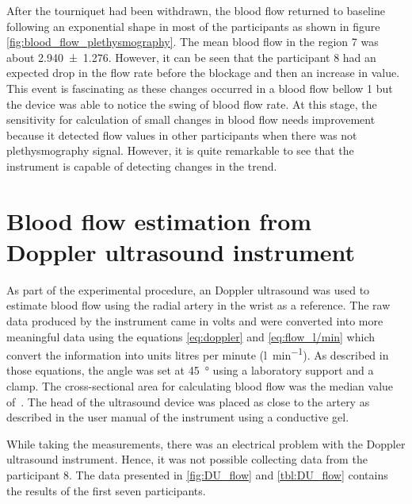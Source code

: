 After the tourniquet had been withdrawn, the blood flow returned to baseline following an exponential shape in most of the participants as shown in figure \ref{fig:blood_flow_plethysmography}. The mean blood flow in the region 7 was about \SI{2.940(1276)}{\bfv}. However, it can be seen that the participant 8 had an expected drop in the flow rate before the blockage and then an increase in value. This event is fascinating as these changes occurred in a blood flow bellow \SI{1}{\bfv} but the device was able to notice the swing of blood flow rate. At this stage, the sensitivity for calculation of small changes in blood flow needs improvement because it detected flow values in other participants when there was not plethysmography signal. However, it is quite remarkable to see that the instrument is capable of detecting changes in the trend.

\section{Blood flow estimation from Doppler ultrasound instrument}
\label{section results 6}
As part of the experimental procedure, an Doppler ultrasound was used to estimate blood flow using the radial artery in the wrist as a reference. The raw data produced by the instrument came in volts and were converted into more meaningful data using the equations \ref {eq:doppler} and \ref {eq:flow_l/min} which convert the information into units litres per minute (\si{\litre\per\minute}). As described in those equations, the angle was set at \SI{45}{\degree} using a laboratory support and a clamp. The cross-sectional area for calculating blood flow was the median value of~\cite {ashraf2010size}. The head of the ultrasound device was placed as close to the artery as described in the user manual of the instrument using a conductive gel.

While taking the measurements, there was an electrical problem with the Doppler ultrasound instrument. Hence, it was not possible collecting data from the participant 8. The data presented in \ref{fig:DU_flow} and \ref{tbl:DU_flow} contains the results of the first seven participants.

